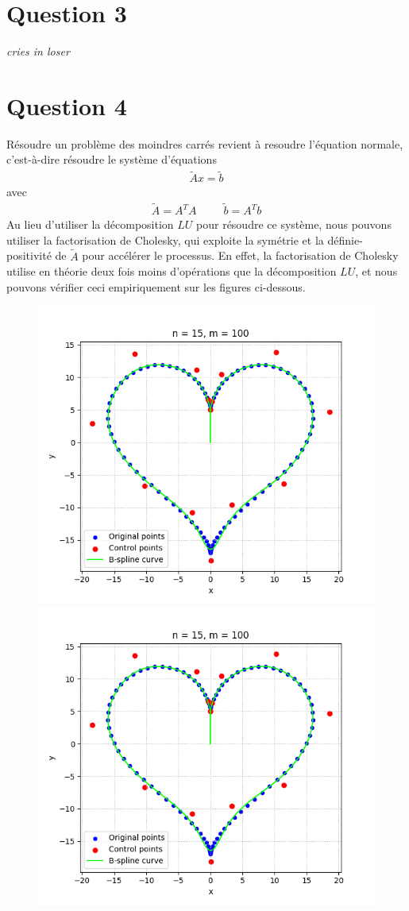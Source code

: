 \documentclass[11pt]{article}
\begin{document}
\section*{Question 3}
\textit{cries in loser}


\section*{Question 4}
Résoudre un problème des moindres carrés revient à resoudre l'équation normale, c'est-à-dire résoudre le système d'équations
\begin{align}
    \tilde{A}x = \tilde{b}
\end{align}
avec
\begin{align}
    \tilde{A} = A^TA ~~~~~~~~~~~ \tilde{b} = A^Tb
\end{align}
Au lieu d'utiliser la décomposition $LU$ pour résoudre ce système, nous pouvons utiliser la factorisation de Cholesky, qui exploite la symétrie et la définie-positivité de $\tilde{A}$ pour accélérer le processus. En effet, la factorisation de Cholesky utilise en théorie deux fois moins d'opérations que la décomposition $LU$, et nous pouvons vérifier ceci empiriquement sur les figures ci-dessous.
\begin{figure}[H]
    \centering
    \includegraphics[scale=0.5]{../../Devoir1/rapport/images/coeur1.png}
    \includegraphics[scale=0.5]{../../Devoir1/rapport/images/coeur1.png}
\end{figure}
\end{document}
